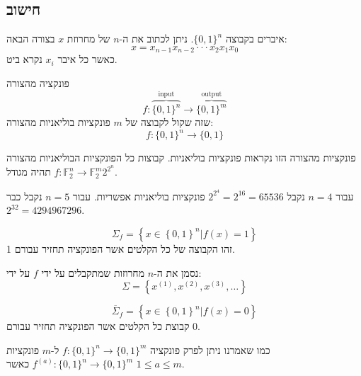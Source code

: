 \documentclass{tstextbook}
\begin{document}
\subsection{חישוב}

\begin{definition}[מחרוזת]
איברים בקבוצה \(\{ 0,1 \}^{n}\). ניתן לכתוב את ה-\(n\) של מחרוזת \(x\) בצורה הבאה:
$$x=x_{n-1}x_{n-2}\cdot\cdot\cdot x_{2}x_{1}x_{0}$$
כאשר כל איבר \(x_{i}\) נקרא ביט.

\end{definition}
\begin{definition}[חישוב]
פונקציה מהצורה
$$f:\overbrace{ \{ 0,1 \}^{n} }^{ \text{input} }\to \overbrace{ \{ 0,1 \}^{m} }^{ \text{output} }$$
שזה שקול לקבוצה של \(m\) פונקציות בוליאניות מהצורה:
$$f:\{ 0,1 \}^{n}\to \{ 0,1 \}$$

\end{definition}
\begin{remark}
פונקציות מהצורה הזו נקראות פונקציות בוליאניות. קבוצות כל הפונקציות הבוליאניות מהצורה \(f:\mathbb{F} _{2}^{n}\to \mathbb{F} _{2}^{m}\) תהיה מגודל\(2^{2^{n}}\).

\end{remark}
\begin{example}
עבור \(n=4\) נקבל \(2^{2^{4}}=2^{16}=65536\) פונקציות בוליאניות אפשריות.
עבור \(n=5\) נקבל כבר \(2^{32}=4294967296\). 

\end{example}
\begin{definition}
$$\Sigma_{f}=\left\{x\in\left\{0,1\right\}^{n}|f\left(x\right)=1\right\}$$
זהו הקבוצה של כל הקלטים אשר הפונקציה תחזיר עבורם 1.

\end{definition}
\begin{symbolize}
נסמן את ה-\(n\) מחרוזות שמתקבלים על ידי \(f\) על ידי:
$$\Sigma=\left\{x^{(1)},x^{(2)},x^{(3)},\ldots\right\}$$

\end{symbolize}
\begin{definition}
$$\overline{{{\Sigma}}}_{f}=\left\{x\in\left\{0,1\right\}^{n}|f\left(x\right)=0\right\}$$
קבוצת כל הקלטים אשר הפונקציה תחזיר עבורם \(0\).

\end{definition}
\begin{symbolize}
כמו שאמרנו ניתן לפרק פונקציה \(f:{\{ 0,1 \}^{n}\to\{ 0,1 \}^{m}}\) ל-\(m\) פונקציות \(f^{(a)}:\{ 0,1 \}^{n}\to \{ 0,1 \}^{m}\) כאשר \(1\leq a \leq m\).

\end{symbolize}
\end{document}
